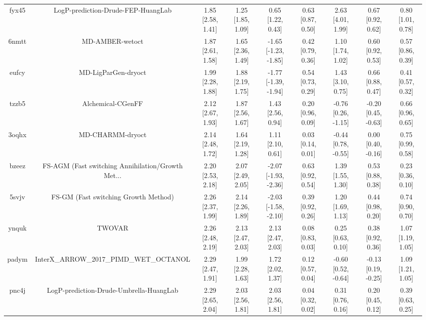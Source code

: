 \documentclass{article}
\begin{document}
\begin{center}
\begin{longtable}{|ccccccccc|}
 fyx45 &                 LogP-prediction-Drude-FEP-HuangLab &  1.85 [2.58, 1.41] &  1.25 [1.85, 1.09] &     0.65 [1.22, 0.43] &  0.63 [0.87, 0.50] &     2.63 [4.01, 1.99] &     0.67 [0.92, 0.62] &     0.80 [1.01, 0.78] \\
 6nmtt &                                    MD-AMBER-wetoct &  1.87 [2.61, 1.58] &  1.65 [2.36, 1.49] &  -1.65 [-1.23, -1.85] &  0.42 [0.79, 0.36] &     1.10 [1.74, 1.02] &     0.60 [0.92, 0.53] &     0.57 [0.86, 0.39] \\
 eufcy &                                MD-LigParGen-dryoct &  1.99 [2.28, 1.88] &  1.88 [2.19, 1.75] &  -1.77 [-1.39, -1.94] &  0.54 [0.73, 0.29] &     1.43 [3.10, 0.75] &     0.66 [0.88, 0.47] &     0.41 [0.57, 0.32] \\
 tzzb5 &                                  Alchemical-CGenFF &  2.12 [2.67, 1.93] &  1.87 [2.56, 1.67] &     1.43 [2.56, 0.94] &  0.20 [0.96, 0.09] &   -0.76 [0.26, -1.15] &   -0.20 [0.45, -0.63] &     0.66 [0.96, 0.65] \\
 3oqhx &                                   MD-CHARMM-dryoct &  2.14 [2.48, 1.72] &  1.64 [2.19, 1.28] &     1.11 [2.10, 0.61] &  0.03 [0.14, 0.01] &   -0.44 [0.78, -0.55] &    0.00 [0.40, -0.16] &     0.75 [0.99, 0.58] \\
 bzeez &  FS-AGM (Fast switching Annihilation/Growth Met... &  2.20 [2.53, 2.18] &  2.07 [2.49, 2.05] &  -2.07 [-1.93, -2.36] &  0.63 [0.92, 0.54] &     1.39 [1.55, 1.30] &     0.53 [0.88, 0.38] &     0.23 [0.36, 0.10] \\
 5svjv &               FS-GM (Fast switching Growth Method) &  2.26 [2.37, 1.99] &  2.14 [2.26, 1.89] &  -2.03 [-1.58, -2.10] &  0.39 [0.92, 0.26] &     1.20 [1.69, 1.13] &     0.44 [0.98, 0.20] &     0.74 [0.90, 0.70] \\
 ynquk &                                             TWOVAR &  2.26 [2.48, 2.19] &  2.13 [2.47, 2.03] &     2.13 [2.47, 2.03] &  0.08 [0.83, 0.03] &     0.25 [0.63, 0.10] &     0.38 [0.92, 0.36] &     1.07 [1.19, 1.05] \\
 padym &            InterX\_ARROW\_2017\_PIMD\_WET\_OCTANOL &  2.29 [2.47, 1.91] &  1.99 [2.28, 1.63] &     1.72 [2.02, 1.37] &  0.12 [0.57, 0.04] &   -0.60 [0.52, -0.64] &   -0.13 [0.19, -0.25] &     1.09 [1.21, 1.05] \\
 pnc4j &            LogP-prediction-Drude-Umbrella-HuangLab &  2.29 [2.65, 2.04] &  2.03 [2.56, 1.81] &     2.03 [2.56, 1.81] &  0.04 [0.32, 0.02] &     0.31 [0.76, 0.16] &     0.20 [0.45, 0.12] &     0.39 [0.63, 0.25] \\

\end{longtable}
\end{center}
\end{document}
